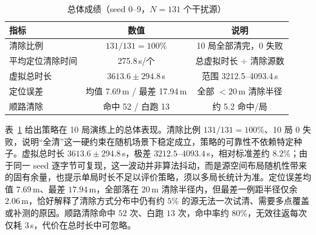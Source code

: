 \documentclass[UTF8, zihao=5,AutoFakeBold=2]{ctexart}
\begin{document}
\begin{table}[H]
    \centering
    \caption{ 总体成绩（seed 0--9，\(N=131\) 个干扰源）}
    \label{tab:t3-overall}
    \begin{tabular}{lcc}
        \toprule
        指标 & 数值 & 说明 \\
        \midrule
        清除比例 & \(131/131=100\%\) & 10 局全部清完，0 失败 \\
        平均定位清除时间 & 275.8\,s/个 & 总虚拟时长 \(\div\) 清除源数 \\
        虚拟总时长 & \(3613.6\pm294.8\)\,s & 范围 3212.5--4093.4\,s \\
        定位误差 & 均值 7.69\,m / 最差 17.94\,m & 全部 \(<20\)\,m 清除半径 \\
        顺路清除 & 命中 52 / 白跑 13 & 约 5.2 命中/局 \\
        \bottomrule
    \end{tabular}
\end{table}

表~\ref{tab:t3-overall} 给出策略在 10 局演练上的总体表现。清除比例 \(131/131=100\%\)、10 局 0 失败，说明“全清”这一硬约束在随机场景下稳定成立，策略的可靠性不依赖特定种子。虚拟总时长 \(3613.6\pm294.8\)\,s，极差 \(3212.5\)--\(4093.4\)\,s，相对标准差约 \(8.2\%\)；由于同一 seed 逐字节可复现，这一波动并非算法抖动，而是源空间布局随机性带来的固有余量，也提示单局时长不足以评价策略，须以多局长统计为准。定位误差均值 \(7.69\)\,m、最差 \(17.94\)\,m，全部落在 \(20\)\,m 清除半径内，但最差一例距半径仅余 \(2.06\)\,m，恰好解释了清除方式分布中仍有约 \(5\%\) 的源无法一次试清、需要多点覆盖或补测的原因。顺路清除命中 \(52\) 次、白跑 \(13\) 次，命中率约 \(80\%\)，无效往返每次仅耗 \(3\)\,s，代价在总时长中可忽略。
\end{document}
